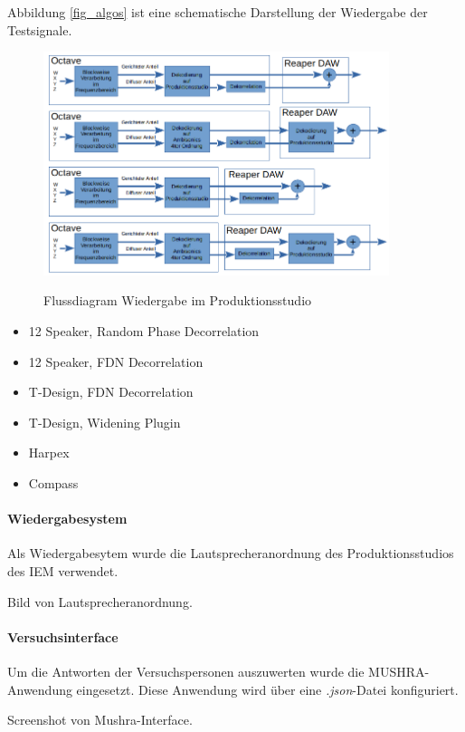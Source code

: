 Abbildung \ref{fig_algos} ist eine schematische Darstellung der Wiedergabe der Testsignale.

\begin{figure}[!ht]
  \centering
  \includegraphics[width=0.9\textwidth]{aufbau/plots/algos.png}
  \label{fig:algos}
  \caption{Flussdiagram Wiedergabe im Produktionsstudio}
\end{figure}

\begin{itemize}
	\item 12 Speaker, Random Phase Decorrelation
	\item 12 Speaker, FDN Decorrelation
	\item T-Design, FDN Decorrelation
	\item T-Design, Widening Plugin
	\item Harpex
	\item Compass
\end{itemize}


\paragraph{Wiedergabesystem}
Als Wiedergabesytem wurde die Lautsprecheranordnung des Produktionsstudios des IEM verwendet.

Bild von Lautsprecheranordnung.

\paragraph{Versuchsinterface}
Um die Antworten der Versuchspersonen auszuwerten wurde die MUSHRA-Anwendung eingesetzt. Diese Anwendung wird über eine \textit{.json}-Datei konfiguriert.

Screenshot von Mushra-Interface.